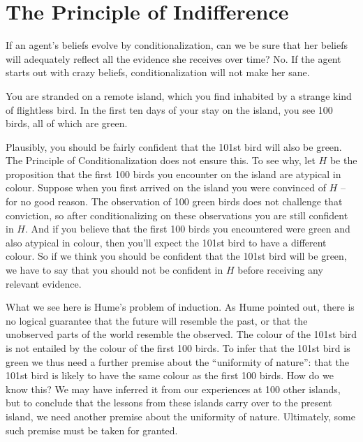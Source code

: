 \section{The Principle of Indifference}

If an agent's beliefs evolve by conditionalization, can we be sure
that her beliefs will adequately reflect all the evidence she receives
over time? No. If the agent starts out with crazy beliefs,
conditionalization will not make her sane.

\begin{example}\label{ex:grue}
  You are stranded on a remote island, which you find inhabited by a
  strange kind of flightless bird. In the first ten days of your stay
  on the island, you see 100 birds, all of which are green.
\end{example}
%
Plausibly, you should be fairly confident that the 101st bird will
also be green. The Principle of Conditionalization does not ensure
this. To see why, let $H$ be the proposition that the first 100 birds
you encounter on the island are atypical in colour. Suppose when you
first arrived on the island you were convinced of $H$ -- for no good
reason. The observation of 100 green birds does not challenge that
conviction, so after conditionalizing on these observations you are
still confident in $H$. And if you believe that the first 100 birds
you encountered were green and also atypical in colour, then
you'll expect the 101st bird to have a different colour. So if we
think you should be confident that the 101st bird will be green, we
have to say that you should not be confident in $H$ before receiving
any relevant evidence.


What we see here is Hume's problem of induction. As Hume pointed out,
there is no logical guarantee that the future will resemble the past,
or that the unobserved parts of the world resemble the
observed. The colour of the 101st bird is not entailed by the colour
of the first 100 birds. To infer that the 101st bird is green we thus
need a further premise about the ``uniformity of nature'': that the
101st bird is likely to have the same colour as the first 100
birds. How do we know this? We may have inferred it from our
experiences at 100 other islands, but to conclude that the lessons
from these islands carry over to the present island, we need another
premise about the uniformity of nature. Ultimately, some such premise
must be taken for granted.

